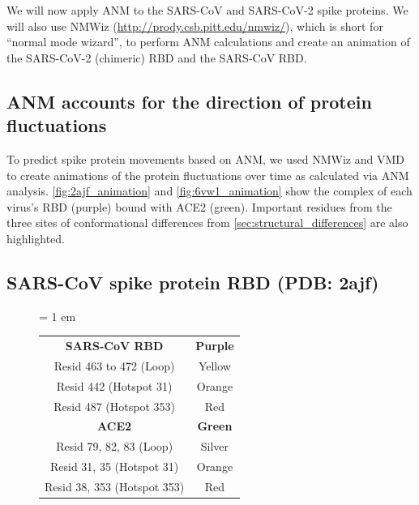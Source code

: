 We will now apply ANM to the SARS-CoV and SARS-CoV-2 spike proteins. We will also use NMWiz (\url{http://prody.csb.pitt.edu/nmwiz/}), which is short for ``normal mode wizard'', to perform ANM calculations and create an animation of the SARS-CoV-2 (chimeric) RBD and the SARS-CoV RBD. 

\FloatBarrier
{}
\subsection{ANM accounts for the direction of protein fluctuations}

To predict spike protein movements based on ANM, we used NMWiz and VMD to create animations of the protein fluctuations over time as calculated via ANM analysis. \autoref{fig:2ajf_animation} and \autoref{fig:6vw1_animation} show the complex of each virus's RBD (purple) bound with ACE2 (green). Important residues from the three sites of conformational differences from \autoref{sec:structural_differences} are also highlighted.

\FloatBarrier
{}
\subsection{SARS-CoV spike protein RBD (PDB: 2ajf)}

\begin{figure}[h]
	\centering
	\tabcolsep = 1 em
	\mySfFamily
	\begin{tabular}{c c }
		\textbf{SARS-CoV RBD} & \textbf{Purple} \\
		Resid 463 to 472 (Loop)  & Yellow \\
		Resid 442 (Hotspot 31)  & Orange \\
		Resid 487 (Hotspot 353)  & Red \\
		\textbf{ACE2}  & \textbf{Green} \\
		Resid 79, 82, 83 (Loop) & Silver \\
		Resid 31, 35 (Hotspot 31) & Orange \\
		Resid 38, 353 (Hotspot 353) & Red \\
	\end{tabular}
	\caption{}
	\label{fig:2ajf_B&F_table}
\end{figure}

